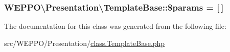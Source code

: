 \subsubsection[{\texorpdfstring{\$params}{$params}}]{\setlength{\rightskip}{0pt plus 5cm}W\+E\+P\+P\+O\textbackslash{}\+Presentation\textbackslash{}\+Template\+Base\+::\$params = \mbox{[}$\,$\mbox{]}\hspace{0.3cm}{\ttfamily [protected]}}\hypertarget{classWEPPO_1_1Presentation_1_1TemplateBase_ae75957248eb5759beec80bbe0317cf8a}{}\label{classWEPPO_1_1Presentation_1_1TemplateBase_ae75957248eb5759beec80bbe0317cf8a}


The documentation for this class was generated from the following file\+:\begin{DoxyCompactItemize}
\item 
src/\+W\+E\+P\+P\+O/\+Presentation/\hyperlink{class_8TemplateBase_8php}{class.\+Template\+Base.\+php}\end{DoxyCompactItemize}
